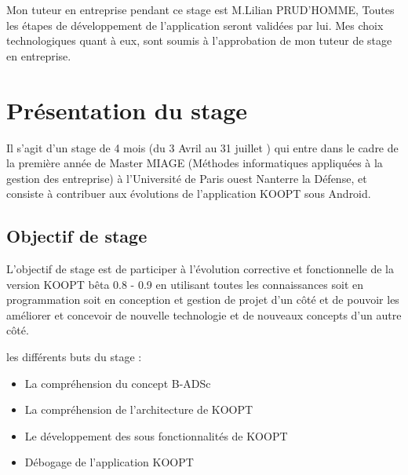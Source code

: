 							
Mon tuteur en entreprise pendant ce stage est M.Lilian PRUD’HOMME, Toutes les  étapes de développement de l’application seront validées par lui. Mes choix technologiques quant à eux, sont soumis à l’approbation de mon tuteur de stage en entreprise.

 \section{Présentation du stage}

Il s’agit d’un stage de 4 mois (du 3 Avril au 31 juillet ) qui entre dans le cadre de la première année de Master MIAGE (Méthodes informatiques appliquées à la gestion des entreprise) à l'Université de Paris ouest Nanterre la Défense, et consiste à contribuer aux évolutions de l’application KOOPT sous Android.

\subsection{Objectif de stage}

L’objectif de stage est de participer à l’évolution corrective et fonctionnelle de la version KOOPT bêta 0.8 - 0.9 en utilisant toutes les connaissances soit en programmation soit en conception et gestion de projet d’un côté et de pouvoir les améliorer et concevoir de nouvelle technologie et de nouveaux concepts d’un autre côté.
 
les différents buts du stage : 

 \begin{itemize}
     \item La compréhension du concept B-ADSc
     \item La compréhension de l’architecture de KOOPT
     \item Le développement des sous fonctionnalités de KOOPT 
     \item Débogage de l’application KOOPT
 \end{itemize}



